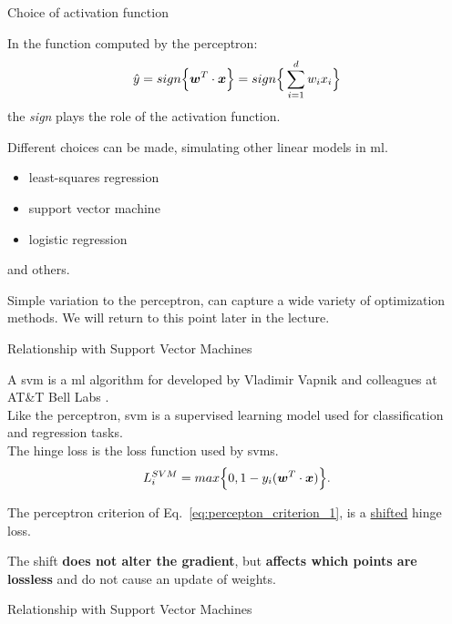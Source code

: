 %
%
%

\begin{frame}[t]{Choice of activation function}

    In the function computed by the \gls{perceptron}: 
    \begin{equation}
        \hat{y} = sign\Big\{ \boldsymbol{w}^T \cdot \boldsymbol{x} \Big\} = sign\Big\{ \sum_{i=1}^{d} w_i x_i \Big\}
    \end{equation}        
    the {\em sign} plays the role of the \gls{activation function}.\\
    \vspace{0.2cm}

    Different choices can be made, 
    simulating other \glspl{linear model} in \gls{ml}.
    \begin{itemize}
        \item least-squares regression
        \item support vector machine
        \item logistic regression
    \end{itemize}
    and others.

    Simple variation to the \gls{perceptron}, can capture a wide variety of optimization methods.
    We will return to this point later in the lecture.\\

\end{frame}


%
%
%

\begin{frame}[t]{Relationship with Support Vector Machines}

    A \gls{svm} is a \gls{ml} algorithm for  
    developed by Vladimir Vapnik and colleagues at AT\&T Bell Labs 
    \cite{Vapnik:1995svm}\cite{Wikipedia:SVM}.\\

    Like the \gls{perceptron}, \gls{svm}
    is a \gls{supervised learning} model 
    used for \gls{classification} 
    and \gls{regression} tasks.\\

    The \gls{hinge loss} is 
    the \gls{loss function}
    used by \glspl{svm}. 
    \begin{equation}
        L_{i}^{SVM} = 
          max\Big\{0, 1 - y_i(\boldsymbol{w}^T \cdot \boldsymbol{x}) \Big\}.
        \label{eq:hinge_loss_1}  
    \end{equation}

    The \gls{perceptron criterion} 
    of Eq.~\ref{eq:percepton_criterion_1}, is a \underline{shifted} \gls{hinge loss}.

    The shift {\bf does not alter the gradient}, 
    but {\bf affects which points are lossless} and do not cause an update of weights.

\end{frame}

%
%
%

\begin{frame}[t]{Relationship with Support Vector Machines}

\end{frame}
